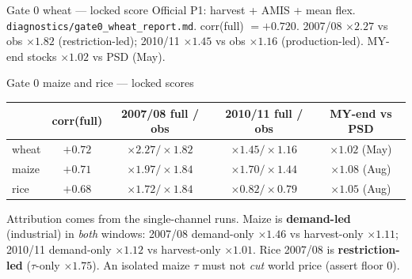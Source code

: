 \begin{frame}[label=gate0scores]{Gate 0 wheat --- locked score}
{\scriptsize Official P1: harvest + AMIS + mean flex.
\texttt{diagnostics/gate0\_wheat\_report.md}.
corr(full) $=+0.720$. 2007/08 $\times 2.27$ vs obs $\times 1.82$
(restriction-led); 2010/11 $\times 1.45$ vs obs $\times 1.16$
(production-led). MY-end stocks $\times 1.02$ vs PSD (May).}
\end{frame}

\begin{frame}{Gate 0 maize and rice --- locked scores}
{\scriptsize
\renewcommand{\arraystretch}{1.0}
\setlength{\tabcolsep}{4pt}
\begin{tabular}{@{}lcccc@{}}
\toprule
 & corr(full) & 2007/08 full / obs & 2010/11 full / obs & MY-end vs PSD \\
\midrule
wheat & $+0.72$ & $\times 2.27 / \times 1.82$ & $\times 1.45 / \times 1.16$ & $\times 1.02$ (May) \\
maize & $+0.71$ & $\times 1.97 / \times 1.84$ & $\times 1.70 / \times 1.44$ & $\times 1.08$ (Aug) \\
rice  & $+0.68$ & $\times 1.72 / \times 1.84$ & $\times 0.82 / \times 0.79$ & $\times 1.05$ (Aug) \\
\bottomrule
\end{tabular}}

\vspace{0.4em}
{\scriptsize
Attribution comes from the single-channel runs. Maize is
\textbf{demand-led} (industrial) in \emph{both} windows: 2007/08
demand-only $\times 1.46$ vs harvest-only $\times 1.11$; 2010/11
demand-only $\times 1.12$ vs harvest-only $\times 1.01$. Rice 2007/08 is
\textbf{restriction-led} ($\tau$-only $\times 1.75$). An isolated maize
$\tau$ must not \emph{cut} world price (assert floor $0$).}
\end{frame}


